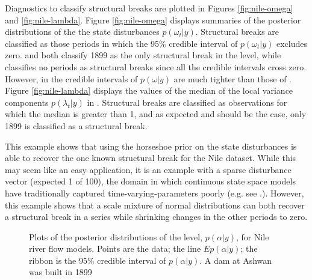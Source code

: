 \documentclass{article}
\begin{document}
Diagnostics to classify structural breaks are plotted in Figures \ref{fig:nile-omega} and \ref{fig:nile-lambda}.
Figure \ref{fig:nile-omega} displays summaries of the posterior distributions of the the state disturbances $p(\omega_{t} | y)$.
Structural breaks are classified as those periods in which the 95\% credible interval of $p(\omega_{t} | y)$ excludes zero.
 and  both classify 1899 as the only structural break in the level, while  classifies no periods as structural breaks since all the credible intervals cross zero.
However, in  the credible intervals of $p(\omega|y)$ are much tighter than those of .
Figure \ref{fig:nile-lambda} displays the values of the median of the local variance components $p(\lambda_{t} | y)$ in .
Structural breaks are classified as observations for which the median is greater than 1, and as expected and should be the case, only 1899 is classified as a structural break.

This example shows that using the horseshoe prior on the state disturbances is able to recover the one known structural break for the Nile dataset.
While this may seem like an easy application, it is an example with a sparse disturbance vector (expected 1 of 100), the domain in which continuous state space models have traditionally captured time-varying-parameters poorly (e.g. see .).
However, this example shows that a scale mixture of normal distributions can both recover a structural break in a series while shrinking changes in the other periods to zero.

\begin{figure}[htpb]
  \centering
  \begin{subfigure}{1.0\textwidth}
    \caption{}
    \label{fig:nile-posterior-1}    
  \end{subfigure}
  \begin{subfigure}{1.0\textwidth}
    \caption{}
    \label{fig:nile-posterior-2}
  \end{subfigure}
  \begin{subfigure}{1.0\textwidth}
    \caption{}
    \label{fig:nile-posterior-3}
  \end{subfigure}
  \caption{Plots of the posterior distributions of the level, $p(\alpha | y)$, for Nile river flow models. Points are the data; the line $E p(\alpha | y)$; the ribbon is the 95\% credible interval of $p(\alpha | y)$. A dam at Ashwan was built in 1899}
  \label{fig:nile-posterior}
\end{figure}
\end{document}

